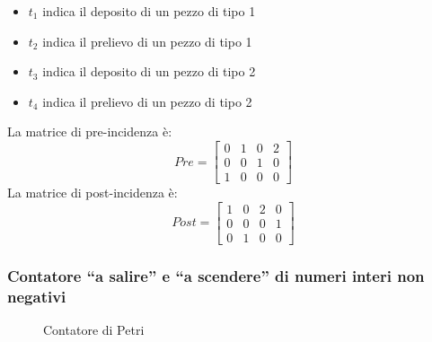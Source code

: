 \documentclass[a4paper]{report}
\begin{document}
\begin{itemize}
\item $t_1$ indica il deposito di un pezzo di tipo 1
\item $t_2$ indica il prelievo di un pezzo di tipo 1
\item $t_3$ indica il deposito di un pezzo di tipo 2
\item $t_4$ indica il prelievo di un pezzo di tipo 2
\end{itemize}
La matrice di pre-incidenza \`e:
\[
Pre =
\begin{bmatrix}
  0 & 1 & 0 & 2\\
  0 & 0 & 1 & 0\\
  1 & 0 & 0 & 0
\end{bmatrix}
\]
La matrice di post-incidenza \`e:
\[
Post = 
\begin{bmatrix}
  1 & 0 & 2 & 0\\
  0 & 0 & 0 & 1\\
  0 & 1 & 0 & 0
\end{bmatrix}
\]

\subsubsection{Contatore ``a salire'' e ``a scendere'' di numeri
  interi non negativi}

\begin{figure}[!h]
  \centering
  \label{fig:contatorePetri}
  \caption{Contatore di Petri}
\end{figure}
\end{document}
